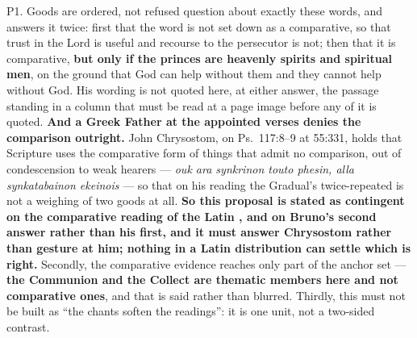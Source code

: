 \begin{proposal}{P1. Goods are ordered, not refused}
{{question about exactly these words, and answers it twice}: first that the word
is not set down as a comparative, so that trust in the Lord is useful and
recourse to the persecutor is not; then that it is comparative, \textbf{but only
if the princes are heavenly spirits and spiritual men}, on the ground that God
can help without them and they cannot help without God. His wording is not
quoted here, at either answer, the passage standing in a column that must be
read at a page image before any of it is quoted. \textbf{And a Greek Father at
the appointed verses denies the comparison outright.} John Chrysostom, on
Ps.\ 117:8--9 at  55:331, holds that Scripture uses the
comparative form of things that admit no comparison, out of condescension to
weak hearers --- \emph{ouk ara synkrinon touto phesin, alla synkatabainon
ekeinois} --- so that on his reading the Gradual's twice-repeated  is not a weighing of two goods at all. \textbf{So this
proposal is stated as contingent on the comparative reading of the Latin
, and on Bruno's second answer rather than his first, and it must
answer Chrysostom rather than gesture at him; nothing in a Latin distribution
can settle which is right.} Secondly, the
comparative evidence reaches only part of the anchor set --- \textbf{the
Communion and the Collect are thematic members here and not comparative ones},
and that is said rather than blurred. Thirdly, this must not be built as ``the chants soften
the readings'': it is one unit, not a two-sided contrast.}
\end{proposal}

